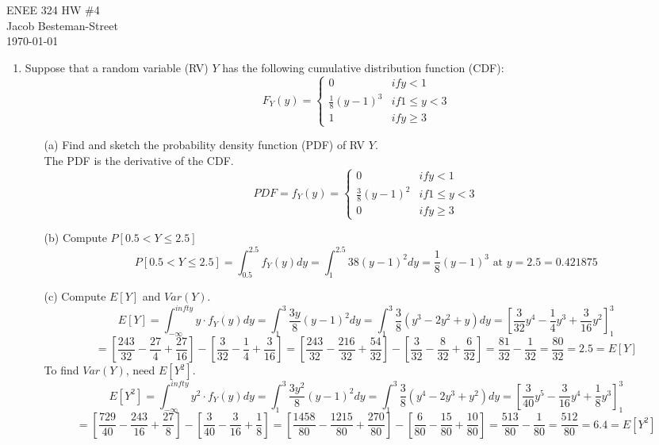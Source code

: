 \documentclass{report}
\begin{document}
ENEE 324 HW \#4 \\
Jacob Besteman-Street \\
\today \\
\begin{enumerate}
\item Suppose that a random variable (RV) $Y$ has the following cumulative distribution function (CDF): \\
$$ F_Y(y) = \left. \begin{cases}
0 & if y < 1 \\
\frac{1}{8}(y-1)^3 & if 1 \leq y < 3 \\
1 & if y \geq 3
\end{cases} \right.$$
\begin{itemize}
  \item[(a)] Find and sketch the probability density function (PDF) of RV $Y$. \\
  The PDF is the derivative of the CDF.
  $$ PDF = f_Y(y) = \left. \begin{cases}
  0 & if y < 1 \\
  \frac{3}{8}(y-1)^2 & if 1 \leq y < 3 \\
  0 & if y \geq 3
  \end{cases} \right.$$
  \item[(b)] Compute $P[0.5<Y \leq 2.5 ]$ \\
  $$ P[0.5<Y \leq 2.5 ] = \int_{0.5}^{2.5} f_Y(y) dy = \int_{1}^{2.5} {3}{8}(y-1)^2 dy = \frac{1}{8}(y-1)^3 \text{ at } y=2.5 = 0.421875 $$
  \item[(c)] Compute $E[Y]$ and $Var(Y)$. \\
  $$ E[Y] = \int_{-\infty}^{infty}y \cdot f_Y(y) dy = \int_{1}^{3} \frac{3y}{8}(y-1)^2 dy = \int_{1}^{3} \frac{3}{8}(y^3 - 2y^2 + y) dy = [\frac{3}{32}y^4 - \frac{1}{4}y^3 + \frac{3}{16}y^2]_{1}^{3} $$
$$ = [\frac{243}{32} - \frac{27}{4} + \frac{27}{16}] - [\frac{3}{32} - \frac{1}{4} + \frac{3}{16}] = [\frac{243}{32} - \frac{216}{32} + \frac{54}{32}] - [\frac{3}{32} - \frac{8}{32} + \frac{6}{32}]  = \frac{81}{32} - \frac{1}{32} = \frac{80}{32} = 2.5 = E[Y]   $$
To find $Var(Y)$, need $E[Y^2]$.
$$ E[Y^2] = \int_{-\infty}^{infty}y^2 \cdot f_Y(y) dy = \int_{1}^{3} \frac{3y^2}{8}(y-1)^2 dy = \int_{1}^{3} \frac{3}{8}(y^4 - 2y^3 + y^2) dy = [\frac{3}{40}y^5 - \frac{3}{16}y^4 + \frac{1}{8}y^3]_{1}^{3} $$
$$ = [\frac{729}{40} - \frac{243}{16} + \frac{27}{8}] - [\frac{3}{40} - \frac{3}{16} + \frac{1}{8}] = [\frac{1458}{80} - \frac{1215}{80} + \frac{270}{80}] - [\frac{6}{80} - \frac{15}{80} + \frac{10}{80}] = \frac{513}{80} - \frac{1}{80} = \frac{512}{80} = 6.4 = E[Y^2] $$

\end{itemize}
\end{enumerate}
\end{document}

